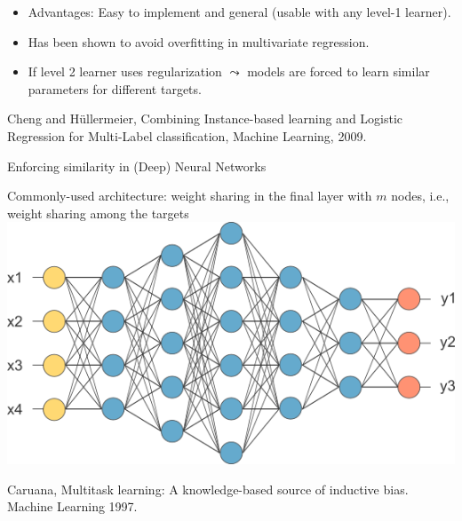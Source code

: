\documentclass[11pt,compress,t,notes=noshow, xcolor=table]{beamer}
\begin{document}
\begin{frame}
\begin{columns}
\begin{column}{5cm}
		\end{column}
	\end{columns}
%
	\begin{itemize}
		\item Advantages: Easy to implement and general (usable with any level-1 learner). 
		\item Has been shown to avoid overfitting in multivariate regression.
		\item If level 2 learner uses regularization $\leadsto$ models are forced to learn similar parameters for different targets.  
	\end{itemize}
	{\tiny Cheng and H\"ullermeier, Combining Instance-based learning and Logistic Regression for Multi-Label classification, Machine Learning, 2009.}
	
\end{frame}

\begin{frame}{Enforcing similarity in (Deep) Neural Networks}
	\small
	\begin{center}
		Commonly-used architecture: weight sharing in the final layer with $m$ nodes, i.e., weight sharing among the targets \\
		\vspace{0.2cm}
		\includegraphics[scale=0.4]{figure/weightsharing}
	\end{center}

{\tiny Caruana, Multitask learning: A knowledge-based source of inductive bias. Machine	Learning 1997.}
\end{frame}
\end{document}
